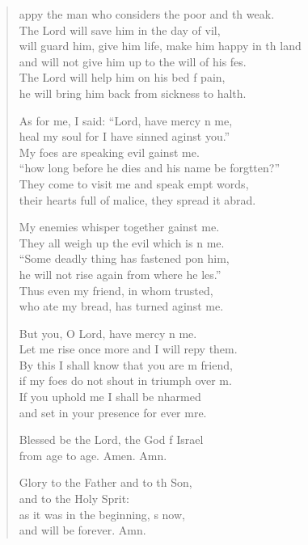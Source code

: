 \settowidth{\versewidth}{will guard him, give him life, make him happy in the land *}
\begin{verse}%
  \begin{patverse}
appy the man who considers the poor and th weak.\Med\\
The Lord will save him in the day of vil,\\
will guard him, give him life, make him happy in th land\Med\\
and will not give him up to the will of his fes.\\
The Lord will help him on his bed f pain,\Med\\
he will bring him back from sickness to halth.

As for me, I said: “Lord, have mercy n me,\Med\\
heal my soul for I have sinned aginst you.”\\
My foes are speaking evil gainst me.\Med\\
“how long before he dies and his name be forgtten?”\Med\\
They come to visit me and speak empt words,\\
their hearts full of malice, they spread it abrad.

My enemies whisper together gainst me.\Med\\
They all weigh up the evil which is n me.\\
“Some deadly thing has fastened pon him,\Med\\
he will not rise again from where he l\pointup{\i}es.”\\
Thus even my friend, in whom  trusted,\Med\\
who ate my bread, has turned aginst me.

But you, O Lord, have mercy n me.\Med\\
Let me rise once more and I will repy them.\\
By this I shall know that you are m friend,\Med\\
if my foes do not shout in triumph over m.\\
If you uphold me I shall be nharmed\Med\\
and set in your presence for ever mre.

Blessed be the Lord, the God f Israel\Med\\
from age to age. Amen. Amn.

Glory to the Father and to th Son,\Med\\
and to the Holy Sp\pointup{\i}rit:\\
as it was in the beginning, \pointup{\i}s now,\Med\\
and will be forever. Amn. 
  \end{patverse}
\end{verse}
